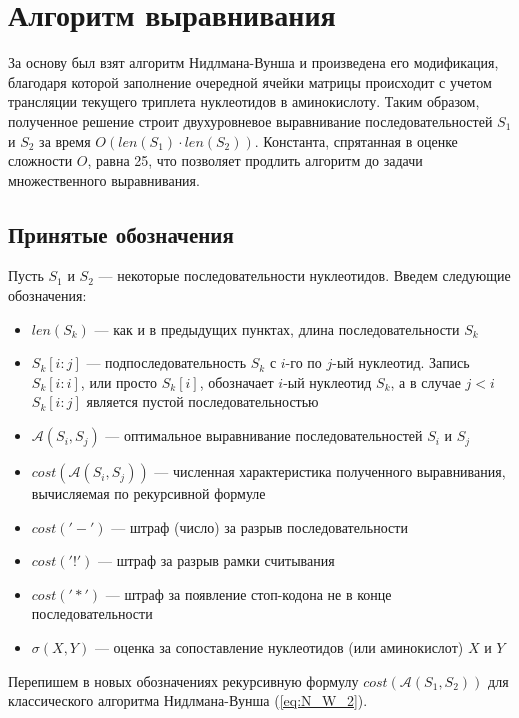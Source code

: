 \newpage

\section[Алгоритм выравнивания]{\large \centering Алгоритм выравнивания}
\hspace{\parindent} За основу был взят алгоритм Нидлмана-Вунша и произведена его модификация, благодаря которой заполнение очередной ячейки матрицы происходит с учетом трансляции текущего триплета нуклеотидов в аминокислоту. Таким образом, полученное решение строит двухуровневое выравнивание последовательностей $S_1$ и $S_2$ за время $O(len(S_1)\cdot len(S_2))$. Константа, спрятанная в оценке сложности $O$, равна 25, что позволяет продлить алгоритм до задачи множественного выравнивания.

\subsection[Принятые обозначения]{\large Принятые обозначения}
\hspace{\parindent} Пусть $S_1$ и $S_2$ --- некоторые последовательности нуклеотидов. Введем следующие обозначения:
\begin{itemize}
	\item $len(S_k)$ --- как и в предыдущих пунктах, длина последовательности $S_k$
	\item $S_k[i:j]$ --- подпоследовательность $S_k$ с $i$-го по $j$-ый нуклеотид. Запись $S_k[i:i]$, или просто $S_k[i]$, обозначает $i$-ый нуклеотид $S_k$, а в случае $j < i$ $S_k[i:j]$ является пустой последовательностью
	\item $\mathcal{A}(S_i, S_j)$ --- оптимальное выравнивание последовательностей $S_i$ и $S_j$
	\item $cost(\mathcal{A}(S_i, S_j))$ --- численная характеристика полученного выравнивания, вычисляемая по рекурсивной формуле
	\item $cost('-')$ --- штраф (число) за разрыв последовательности
	\item $cost('!')$ --- штраф за разрыв рамки считывания
	\item $cost('*')$ --- штраф за появление стоп-кодона не в конце последовательности
	\item $\sigma(X, Y)$ --- оценка за сопоставление нуклеотидов (или аминокислот) $X$ и $Y$
\end{itemize}

\indent Перепишем в новых обозначениях рекурсивную формулу $cost(\mathcal{A}(S_1, S_2))$ для классического алгоритма Нидлмана-Вунша (\ref{eq:N_W_2}).

